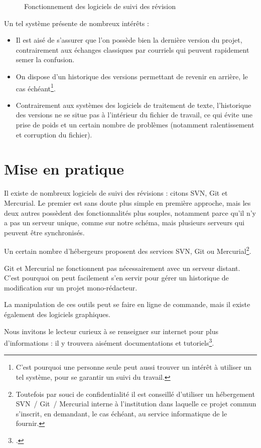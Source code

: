 \begin{figure}[ht]
\centering

\caption{Fonctionnement des logiciels de suivi des révision}\label{svn}
\end{figure}

Un tel système présente de nombreux intérêts :
\begin{itemize}
\item Il est aisé de s'assurer que l'on possède bien la dernière version du projet, contrairement aux échanges classiques par courriels qui peuvent rapidement semer la confusion.
\item On dispose d'un historique des versions permettant de revenir en arrière, le cas échéant\footnote{C'est pourquoi une personne seule peut aussi trouver un intérêt à utiliser un tel système, pour se garantir un suivi du travail.}.
\item Contrairement aux systèmes des logiciels de traitement de texte, l'historique des versions ne se situe pas à l'intérieur du fichier de travail, ce qui évite une prise de poids et un certain nombre de problèmes (notamment ralentissement et corruption du fichier).
\end{itemize}


\section{Mise en pratique}
Il existe de nombreux logiciels de suivi des révisions  : citons SVN, Git et Mercurial. Le premier est sans doute plus simple en première approche, mais les deux autres possèdent des fonctionnalités plus souples, notamment parce qu'il n'y a pas un serveur unique, comme sur notre schéma, mais plusieurs serveurs qui peuvent être synchronisés.

Un certain nombre d'hébergeurs proposent des services SVN, Git ou Mercurial\footnote{Toutefois par souci de confidentialité il est conseillé d'utiliser un hébergement SVN~/ Git~/ Mercurial interne à l'institution dans laquelle ce projet commun s'inscrit, en demandant, le cas échéant, au service informatique de le fournir.}. 

Git et Mercurial ne fonctionnent pas nécessairement avec un serveur distant. C'est pourquoi on peut facilement s'en servir pour gérer un historique de modification sur un projet mono-rédacteur.

La manipulation de ces outils peut se faire en ligne de commande, mais il existe également des logiciels graphiques.

Nous invitons le lecteur curieux à se renseigner sur internet pour plus d'informations : il y trouvera aisément documentations et tutoriels\footcite[Nous recommandons, pour Git, cet excellent livre :][]{progit}.
